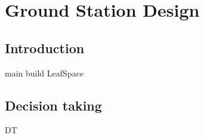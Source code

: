 \chapter{Ground Station Design}
\section{Introduction}
{main}
{build}
{LeafSpace}
\section{Decision taking}
{DT}
%
%
